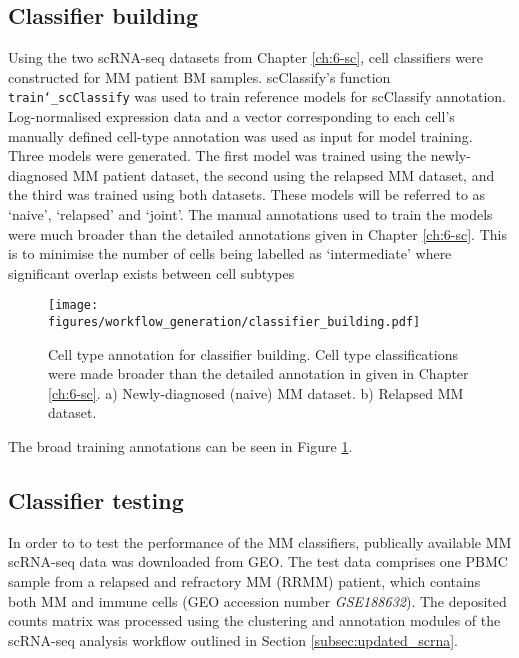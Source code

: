 \subsection{Classifier building}\label{subsec:MM_classifier_model_building}
Using the two scRNA-seq datasets from Chapter \ref{ch:6-sc}, cell classifiers were constructed for MM patient BM samples.
scClassify's function \texttt{train\char`_scClassify} was used to train reference models for scClassify annotation.
Log-normalised expression data and a vector corresponding to each cell's manually defined cell-type annotation was used as input for model training.
Three models were generated.
The first model was trained using the newly-diagnosed MM patient dataset, the second using the relapsed MM dataset, and the third was trained using  both datasets.
These models will be referred to as `naive', `relapsed' and `joint'.
The manual annotations used to train the models were much broader than the detailed annotations given in Chapter \ref{ch:6-sc}.
This is to minimise the number of cells being labelled as `intermediate' where significant overlap exists between cell subtypes
%
\begin{figure}[htb]
\centering
\texttt{[image: figures/workflow\_generation/classifier\_building.pdf]}
\caption[Classifier annotation building]{Cell type annotation for classifier building.
Cell type classifications were made broader than the detailed annotation in given in Chapter \ref{ch:6-sc}.
a) Newly-diagnosed (naive) MM dataset.
b) Relapsed MM dataset.}
\label{fig:classifier_building}
\end{figure}
%
The broad training annotations can be seen in Figure \ref{fig:classifier_building}.

\subsection{Classifier testing}
In order to to test the performance of the MM classifiers, publically available MM scRNA-seq data was downloaded from GEO\@.
The test data comprises one PBMC sample from a relapsed and refractory MM (RRMM) patient, which contains both MM and immune cells (GEO accession number \textit{GSE188632}).
The deposited counts matrix was processed using the clustering and annotation modules of the scRNA-seq analysis workflow outlined in Section \ref{subsec:updated_scrna}.

